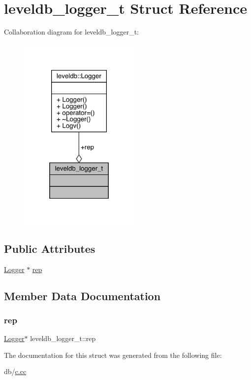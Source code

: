 \hypertarget{structleveldb__logger__t}{}\section{leveldb\+\_\+logger\+\_\+t Struct Reference}
\label{structleveldb__logger__t}


Collaboration diagram for leveldb\+\_\+logger\+\_\+t\+:
\nopagebreak
\begin{figure}[H]
\begin{center}
\leavevmode
\includegraphics[width=169pt]{structleveldb__logger__t__coll__graph}
\end{center}
\end{figure}
\subsection*{Public Attributes}
\begin{DoxyCompactItemize}
\item 
\mbox{\hyperlink{classleveldb_1_1_logger}{Logger}} $\ast$ \mbox{\hyperlink{structleveldb__logger__t_aa27dd9e07077dbde7b776c8f548c749b}{rep}}
\end{DoxyCompactItemize}


\subsection{Member Data Documentation}
\mbox{\label{structleveldb__logger__t_aa27dd9e07077dbde7b776c8f548c749b}} 
\subsubsection{\texorpdfstring{rep}{rep}}
{\footnotesize\ttfamily \mbox{\hyperlink{classleveldb_1_1_logger}{Logger}}$\ast$ leveldb\+\_\+logger\+\_\+t\+::rep}



The documentation for this struct was generated from the following file\+:\begin{DoxyCompactItemize}
\item 
db/\mbox{\hyperlink{c_8cc}{c.\+cc}}\end{DoxyCompactItemize}
